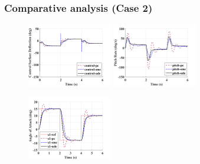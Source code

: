 \documentclass[table,10pt,red]{beamer}	%
\begin{document}
\begin{frame} 
\frametitle{Comparative analysis (Case 2)}

\begin{figure}
\includegraphics[width=3.7cm]{control_kcn_13_kcm_07}
\includegraphics[width=3.7cm]{pitch_kcn_13_kcm_07}
\begin{center}
\includegraphics[width=3.7cm]{x1_kcn_13_kcm_07}
\end{center}
\end{figure}
\end{frame}
\end{document}
